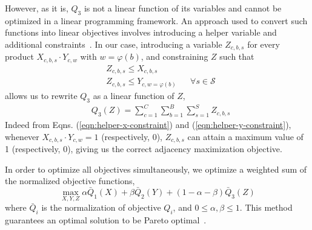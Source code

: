 However, as it is, $Q_3$ is not a linear function of its variables and cannot be
optimized in a linear programming framework. An approach used to convert such
functions into linear objectives involves introducing a helper variable and
additional constraints~\cite{hammer_boolean_1968}. In our case, introducing a
variable $Z_{c, b, s}$ for every product $X_{c, b, s} \cdot Y_{c, w}$ with $w =
\varphi(b)$, and constraining $Z$ such that 
\begin{align}
&Z_{c, b, s} \leq X_{c, b, s} \label{eqn:helper-x-constraint}\\
&Z_{c, b, s} \leq Y_{c, w=\varphi(b)} &&\forall s\in\mathcal{S}
\label{eqn:helper-y-constraint}
\end{align}
allows us to rewrite $Q_3$ as a linear function of $Z$,
\begin{align}
&Q_3(Z) = \sum_{c=1}^{C} \sum_{b=1}^{B} \sum_{s=1}^{S} Z_{c, b, s}
\end{align}
Indeed from Eqns. (\ref{eqn:helper-x-constraint}) and
(\ref{eqn:helper-y-constraint}),  whenever $X_{c, b, s} \cdot Y_{c, w} = 1$
(respectively, 0), $Z_{c, b, s}$ can attain a maximum value of 1 (respectively,
0), giving us the correct adjacency maximization objective.

In order to optimize all objectives simultaneously, we optimize a weighted sum
of the normalized objective functions,
\begin{equation}
\max_{X, Y, Z} \alpha \bar{Q}_1(X) + \beta \bar{Q}_2(Y) + (1 - \alpha - \beta)
\bar{Q}_3(Z)
\end{equation}
where $\bar{Q}_i$ is the normalization of objective $Q_i$, and $0 \leq \alpha,
\beta \leq 1$. This method guarantees an optimal solution to be Pareto optimal~\cite{stanimirovic_linear_2011}.


